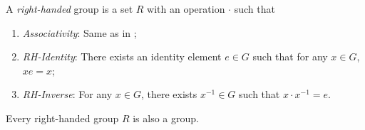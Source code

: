 \documentclass{article}
\begin{document}
\begin{defn}\label{defn:rh-grp}
  A \emph{right-handed} group is a set $R$ with an operation $\cdot$ such that
  \begin{enumerate}
  \item \emph{Associativity}: Same as in ;
  \item \emph{RH-Identity}: There exists an identity element $e \in G$ such that for any $x \in G$, $xe = x$;
  \item \emph{RH-Inverse}: For any $x \in G$, there exists $x^{-1} \in G$ such that $x \cdot x^{-1} = e$.
  \end{enumerate}
\end{defn}

\begin{theorem}\label{thrm:rh-grp_is_grp}
  Every right-handed group $R$ is also a group.
\end{theorem}
\end{document}
